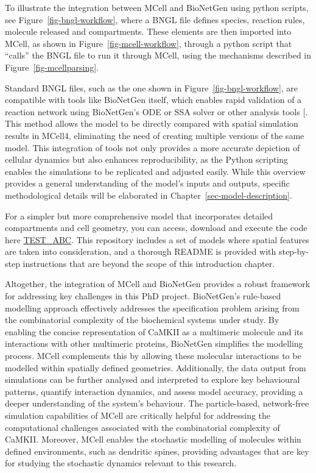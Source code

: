\documentclass[
  11pt,
  letterpaper,
]{scrreprt}
\begin{document}
To illustrate the integration between MCell and BioNetGen using python
scripts, see Figure~\ref{fig-bngl-workflow}, where a BNGL file defines
species, reaction rules, molecule released and compartments. These
elements are then imported into MCell, as shown in
Figure~\ref{fig-mcell-workflow}, through a python script that ``calls''
the BNGL file to run it through MCell, using the mechanisms described in
Figure~\ref{fig-mcellparsing}.

Standard BNGL files, such as the one shown in
Figure~\ref{fig-bngl-workflow}, are compatible with tools like BioNetGen
itself, which enables rapid validation of a reaction network using
BioNetGen's ODE or SSA solver or other analysis tools
{[}\citeproc{ref-harris2016BioNetGena}{245}{]}. This method allows the
model to be directly compared with spatial simulation results in MCell4,
eliminating the need of creating multiple versions of the same model.
This integration of tools not only provides a more accurate depiction of
cellular dynamics but also enhances reproducibility, as the Python
scripting enables the simulations to be replicated and adjusted easily.
While this overview provides a general understanding of the model's
inputs and outputs, specific methodological details will be elaborated
in Chapter~\ref{sec-model-description}.

For a simpler but more comprehensive model that incorporates detailed
compartments and cell geometry, you can access, download and execute the
code here \href{https://github.com/Susana465/test_ABC}{TEST\_ABC}. This
repository includes a set of models where spatial features are taken
into consideration, and a thorough README is provided with step-by-step
instructions that are beyond the scope of this introduction chapter.

Altogether, the integration of MCell and BioNetGen provides a robust
framework for addressing key challenges in this PhD project. BioNetGen's
rule-based modelling approach effectively addresses the specification
problem arising from the combinatorial complexity of the biochemical
systems under study. By enabling the concise representation of CaMKII as
a multimeric molecule and its interactions with other multimeric
proteins, BioNetGen simplifies the modelling process. MCell complements
this by allowing these molecular interactions to be modelled within
spatially defined geometries. Additionally, the data output from
simulations can be further analysed and interpreted to explore key
behavioural patterns, quantify interaction dynamics, and assess model
accuracy, providing a deeper understanding of the system's behaviour.
The particle-based, network-free simulation capabilities of MCell are
critically helpful for addressing the computational challenges
associated with the combinatorial complexity of CaMKII. Moreover, MCell
enables the stochastic modelling of molecules within defined
environments, such as dendritic spines, providing advantages that are
key for studying the stochastic dynamics relevant to this research.
\end{document}
